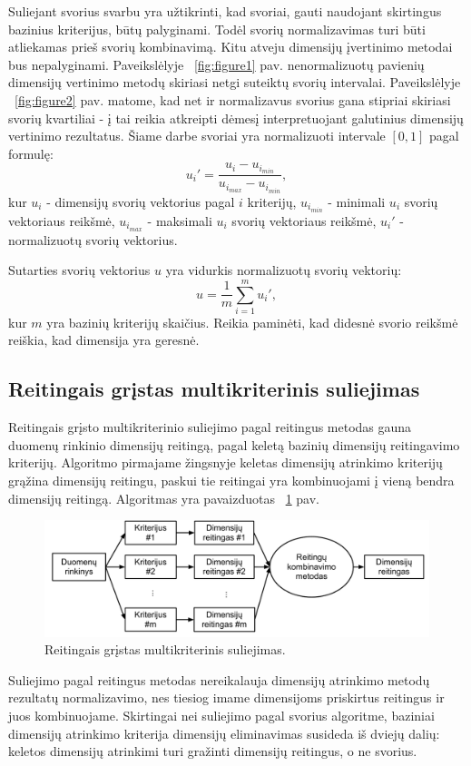 Suliejant svorius svarbu yra užtikrinti, kad svoriai, gauti naudojant
skirtingus bazinius kriterijus, būtų palyginami. Todėl svorių normalizavimas
turi būti atliekamas prieš svorių kombinavimą. Kitu
atveju dimensijų įvertinimo metodai bus nepalyginami. Paveikslėlyje ~\ref{fig:figure1} pav.
nenormalizuotų pavienių dimensijų vertinimo metodų skiriasi netgi suteiktų
svorių intervalai. Paveikslėlyje ~\ref{fig:figure2} pav. matome,
kad net ir normalizavus svorius gana stipriai skiriasi svorių kvartiliai - į 
tai reikia atkreipti dėmesį interpretuojant galutinius dimensijų vertinimo 
rezultatus. Šiame darbe svoriai yra 
normalizuoti intervale $[0, 1]$ pagal formulę:
\begin{equation}
 u_i'=\frac{u_i - u_{i_{min}}}{u_{i_{max}} - u_{i_{min}}}, 
\end{equation}
kur $u_i$ - dimensijų svorių vektorius pagal $i$ kriterijų, 
$u_{i_{min}}$ - minimali $u_i$ svorių vektoriaus reikšmė,
$u_{i_{max}}$ - maksimali $u_i$ svorių vektoriaus reikšmė,
$u_i'$ - normalizuotų svorių vektorius.

Sutarties svorių vektorius $u$ yra vidurkis normalizuotų svorių vektorių:
\begin{equation}
 u = \frac{1}{m}\sum_{i=1}^m u_i',
\end{equation}
kur $m$ yra bazinių kriterijų skaičius. Reikia paminėti, kad didesnė svorio
reikšmė reiškia, kad dimensija yra geresnė.

\subsection{Reitingais grįstas multikriterinis suliejimas}

Reitingais grįsto multikriterinio suliejimo pagal reitingus metodas gauna
duomenų rinkinio dimensijų reitingą,
pagal keletą bazinių dimensijų reitingavimo kriterijų. Algoritmo pirmajame žingsnyje
keletas dimensijų atrinkimo kriterijų grąžina dimensijų reitingu, paskui tie
reitingai yra kombinuojami į vieną bendra dimensijų reitingą.  Algoritmas yra
pavaizduotas ~\ref{fig:figure5} pav.
\begin{figure}
 \centering
 \includegraphics[width=1\textwidth]{images/ranking_based_fusion.pdf}
 \caption{Reitingais grįstas multikriterinis suliejimas.}
 \label{fig:figure5}
\end{figure}
Suliejimo pagal reitingus metodas nereikalauja dimensijų atrinkimo metodų 
rezultatų normalizavimo, nes tiesiog imame dimensijoms priskirtus reitingus ir 
juos kombinuojame. Skirtingai nei suliejimo pagal svorius algoritme, baziniai 
dimensijų atrinkimo kriterija dimensijų eliminavimas\cite{yang2011robust} susideda iš dviejų
dalių: keletos dimensijų atrinkimi turi gražinti dimensijų reitingus, o ne svorius.

